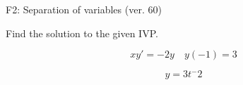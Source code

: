 \begin{exercise}
  \begin{exerciseTitle}F2: Separation of variables (ver. 60)\end{exerciseTitle}
  \begin{exerciseStatement}
    
Find the solution to the given IVP.

    
\[xy'= -2 y \hspace{1em} y( -1 ) = 3\]

  \end{exerciseStatement}
  \begin{exerciseAnswer}
    
\[y= 3 t^ -2\]

  \end{exerciseAnswer}
\end{exercise}